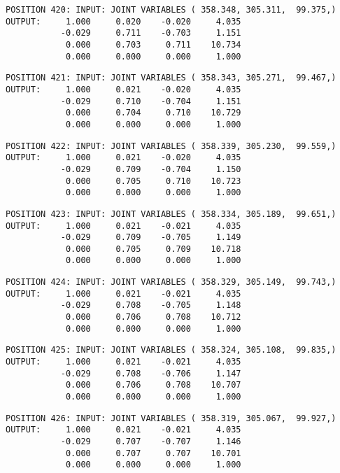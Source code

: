 \begin{verbatim}
POSITION 420: INPUT: JOINT VARIABLES ( 358.348, 305.311,  99.375,)
OUTPUT:     1.000     0.020    -0.020     4.035
           -0.029     0.711    -0.703     1.151
            0.000     0.703     0.711    10.734
            0.000     0.000     0.000     1.000
\end{verbatim} \pagebreak[1]\begin{verbatim}
POSITION 421: INPUT: JOINT VARIABLES ( 358.343, 305.271,  99.467,)
OUTPUT:     1.000     0.021    -0.020     4.035
           -0.029     0.710    -0.704     1.151
            0.000     0.704     0.710    10.729
            0.000     0.000     0.000     1.000
\end{verbatim} \pagebreak[1]\begin{verbatim}
POSITION 422: INPUT: JOINT VARIABLES ( 358.339, 305.230,  99.559,)
OUTPUT:     1.000     0.021    -0.020     4.035
           -0.029     0.709    -0.704     1.150
            0.000     0.705     0.710    10.723
            0.000     0.000     0.000     1.000
\end{verbatim} \pagebreak[1]\begin{verbatim}
POSITION 423: INPUT: JOINT VARIABLES ( 358.334, 305.189,  99.651,)
OUTPUT:     1.000     0.021    -0.021     4.035
           -0.029     0.709    -0.705     1.149
            0.000     0.705     0.709    10.718
            0.000     0.000     0.000     1.000
\end{verbatim} \pagebreak[1]\begin{verbatim}
POSITION 424: INPUT: JOINT VARIABLES ( 358.329, 305.149,  99.743,)
OUTPUT:     1.000     0.021    -0.021     4.035
           -0.029     0.708    -0.705     1.148
            0.000     0.706     0.708    10.712
            0.000     0.000     0.000     1.000
\end{verbatim} \pagebreak[1]\begin{verbatim}
POSITION 425: INPUT: JOINT VARIABLES ( 358.324, 305.108,  99.835,)
OUTPUT:     1.000     0.021    -0.021     4.035
           -0.029     0.708    -0.706     1.147
            0.000     0.706     0.708    10.707
            0.000     0.000     0.000     1.000
\end{verbatim} \pagebreak[1]\begin{verbatim}
POSITION 426: INPUT: JOINT VARIABLES ( 358.319, 305.067,  99.927,)
OUTPUT:     1.000     0.021    -0.021     4.035
           -0.029     0.707    -0.707     1.146
            0.000     0.707     0.707    10.701
            0.000     0.000     0.000     1.000
\end{verbatim} \pagebreak[1]\begin{verbatim}

\end{verbatim}
